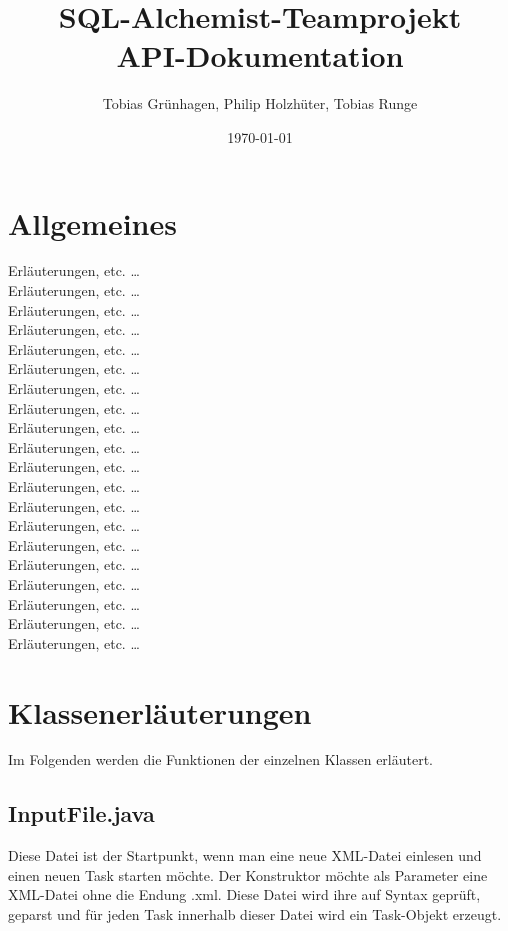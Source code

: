\documentclass[11pt]{report}
\title{\textbf{SQL-Alchemist-Teamprojekt} \\ API-Dokumentation}
\author{Tobias Grünhagen, Philip Holzhüter, Tobias Runge}
\date{\today}
\begin{document}
\maketitle

\chapter{Allgemeines}

Erläuterungen, etc. \ldots \\
Erläuterungen, etc. \ldots\\
Erläuterungen, etc. \ldots \\
Erläuterungen, etc. \ldots\\
 Erläuterungen, etc. \ldots \\
Erläuterungen, etc. \ldots\\
 Erläuterungen, etc. \ldots \\
Erläuterungen, etc. \ldots\\
 Erläuterungen, etc. \ldots \\
Erläuterungen, etc. \ldots\\
 Erläuterungen, etc. \ldots \\
Erläuterungen, etc. \ldots\\
 Erläuterungen, etc. \ldots \\
Erläuterungen, etc. \ldots\\
 Erläuterungen, etc. \ldots \\
Erläuterungen, etc. \ldots\\
 Erläuterungen, etc. \ldots \\
Erläuterungen, etc. \ldots\\
 Erläuterungen, etc. \ldots \\
Erläuterungen, etc. \ldots\\
 



\chapter{Klassenerläuterungen}

Im Folgenden werden die Funktionen der einzelnen Klassen erläutert.

\section{InputFile.java}

Diese Datei ist der Startpunkt, wenn man eine neue XML-Datei einlesen und einen neuen Task starten möchte. Der Konstruktor möchte als Parameter eine XML-Datei ohne die Endung \grqq .xml\grqq. Diese Datei wird ihre auf Syntax geprüft, geparst und für jeden Task innerhalb dieser Datei wird ein Task-Objekt erzeugt.
\end{document}
